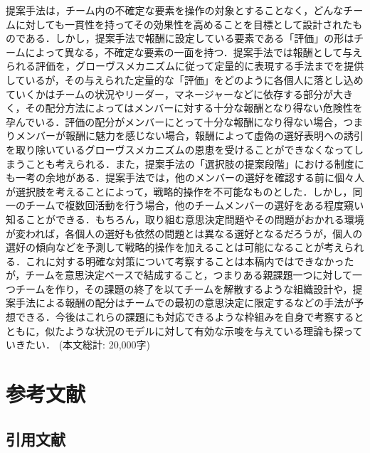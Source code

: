 \documentclass[a4paper, 11pt]{jsarticle}
\begin{document}
提案手法は，チーム内の不確定な要素を操作の対象とすることなく，どんなチームに対しても一貫性を持ってその効果性を高めることを目標として設計されたものである．しかし，提案手法で報酬に設定している要素である「評価」の形はチームによって異なる，不確定な要素の一面を持つ．提案手法では報酬として与えられる評価を，グローヴスメカニズムに従って定量的に表現する手法までを提供しているが，その与えられた定量的な「評価」をどのように各個人に落とし込めていくかはチームの状況やリーダー，マネージャーなどに依存する部分が大きく，その配分方法によってはメンバーに対する十分な報酬となり得ない危険性を孕んでいる．評価の配分がメンバーにとって十分な報酬になり得ない場合，つまりメンバーが報酬に魅力を感じない場合，報酬によって虚偽の選好表明への誘引を取り除いているグローヴスメカニズムの恩恵を受けることができなくなってしまうことも考えられる．また，提案手法の「選択肢の提案段階」における制度にも一考の余地がある．提案手法では，他のメンバーの選好を確認する前に個々人が選択肢を考えることによって，戦略的操作を不可能なものとした．しかし，同一のチームで複数回活動を行う場合，他のチームメンバーの選好をある程度窺い知ることができる．もちろん，取り組む意思決定問題やその問題がおかれる環境が変われば，各個人の選好も依然の問題とは異なる選好となるだろうが，個人の選好の傾向などを予測して戦略的操作を加えることは可能になることが考えられる．これに対する明確な対策について考察することは本稿内ではできなかったが，チームを意思決定ベースで結成すること，つまりある親課題一つに対して一つチームを作り，その課題の終了を以てチームを解散するような組織設計や，提案手法による報酬の配分はチームでの最初の意思決定に限定するなどの手法が予想できる．今後はこれらの課題にも対応できるような枠組みを自身で考察するとともに，似たような状況のモデルに対して有効な示唆を与えている理論も探っていきたい． (本文総計: 20,000字) 
\section*{参考文献}
\subsection*{引用文献}
\begingroup
\renewcommand{\section}[2]{}


\endgroup
\end{document}
